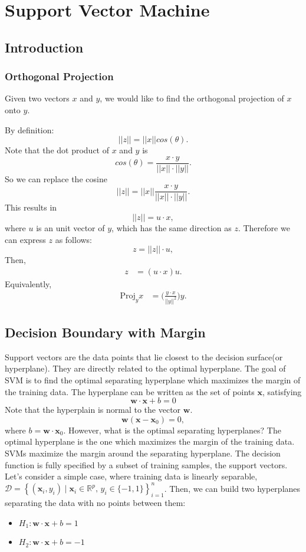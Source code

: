 \chapter{Support Vector Machine}
\section{Introduction}

\subsection{Orthogonal Projection}
Given two vectors $x$ and $y$, we would like to find the orthogonal projection of $x$ onto $y$.

By definition:
$$||z|| = ||x||cos(\theta).$$
Note that the dot product of $x$ and $y$ is 
$$cos(\theta)= \frac{x\cdot y}{||x||\cdot||y||}.$$
So we can replace the cosine 
$$||z|| = ||x||\frac{x\cdot y}{||x||\cdot||y||}.$$
This results in 
$$||z|| = u\cdot x,$$
where $u$ is an unit vector of $y$, which has the same direction as $z$. Therefore we can express $z$ as follows: 
$$z = ||z||\cdot u,$$
Then, 
\begin{align*}
	z &= (u\cdot x)u.
\end{align*}
Equivalently, 
\begin{align*}
	\textrm{Proj}_yx &= \Bigg(\frac{y\cdot x}{||y||^2}\Bigg)y.
\end{align*}

\section{Decision Boundary with Margin}

Support vectors are the data points that lie closest to the decision surface(or hyperplane). They are directly related to the optimal hyperplane. The goal of SVM is to find the optimal separating hyperplane which maximizes the margin of the training data. The hyperplane can be written as the set of points $\mathbf{x}$, satisfying 
$$\mathbf{w}\cdot \mathbf{x}+b=0$$
Note that the hyperplain is normal to the vector $\mathbf{w}$. 
$$\mathbf{w}(\mathbf{x}-\mathbf{x}_0)=0,$$
where $b = \mathbf{w}\cdot\mathbf{x}_0$. However, what is the optimal separating hyperplanes? The optimal hyperplane is the one which maximizes the margin of the training data. SVMs maximize the margin around the separating hyperplane. The decision function is fully specified by a subset of training samples, the support vectors. Let's consider a simple case, where training data is linearly separable, $\mathcal{D} = \left\{ (\mathbf{x}_i, y_i)\mid\mathbf{x}_i \in \mathbb{R}^p,\, y_i \in \{-1,1\}\right\}_{i=1}^n$. Then, we can build two hyperplanes separating the data with no points between them:
\begin{itemize}
	\item $H_1:\mathbf{w}\cdot \mathbf{x}+b=1$
	\item $H_2:\mathbf{w}\cdot \mathbf{x}+b=-1$
\end{itemize}

